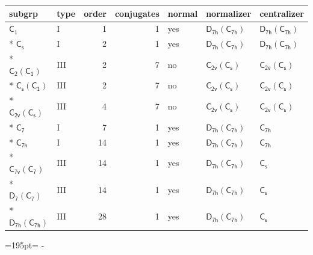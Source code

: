 \documentclass[10pt,a4paper]{article}
\newcommand{\needspace}[1]{\par\penalty-100\begingroup\dimen0=#1\relax\dimen2=\pagegoal
  \advance\dimen2-\pagetotal\ifdim\dimen0>\dimen2\relax\ifdim\dimen2>0pt\vfil\break\fi\fi
  \endgroup}
\numberwithin{equation}{section}
\newcommand{\grp}[1]{\mathsf{#1}}
\begin{document}
{\small\begin{longtable}{@{}llrrlll@{}}\toprule
subgrp & type & order & conjugates & normal & normalizer & centralizer\\\midrule\endhead
\bottomrule\endfoot\endlastfoot
\href{../../../rotation/data/pdf/C1.pdf}{$\grp{C_{1}}$} & I & 1 & 1 & yes & \href{D7h-C7h.pdf}{$\grp{D_{7h}}(\grp{C_{7h}})$} & \href{D7h-C7h.pdf}{$\grp{D_{7h}}(\grp{C_{7h}})$}\\*
\href{../../../rotation/data/pdf/C1v.pdf}{$\grp{C_{s}}$} & I & 2 & 1 & yes & \href{D7h-C7h.pdf}{$\grp{D_{7h}}(\grp{C_{7h}})$} & \href{D7h-C7h.pdf}{$\grp{D_{7h}}(\grp{C_{7h}})$}\\*
\href{C2-C1.pdf}{$\grp{C_{2}}(\grp{C_{1}})$} & III & 2 & 7 & no & \href{C2v-C1v.pdf}{$\grp{C_{2v}}(\grp{C_{s}})$} & \href{C2v-C1v.pdf}{$\grp{C_{2v}}(\grp{C_{s}})$}\\*
\href{C1v-C1.pdf}{$\grp{C_{s}}(\grp{C_{1}})$} & III & 2 & 7 & no & \href{C2v-C1v.pdf}{$\grp{C_{2v}}(\grp{C_{s}})$} & \href{C2v-C1v.pdf}{$\grp{C_{2v}}(\grp{C_{s}})$}\\*
\href{C2v-C1v.pdf}{$\grp{C_{2v}}(\grp{C_{s}})$} & III & 4 & 7 & no & \href{C2v-C1v.pdf}{$\grp{C_{2v}}(\grp{C_{s}})$} & \href{C2v-C1v.pdf}{$\grp{C_{2v}}(\grp{C_{s}})$}\\*
\href{../../../rotation/data/pdf/C7.pdf}{$\grp{C_{7}}$} & I & 7 & 1 & yes & \href{D7h-C7h.pdf}{$\grp{D_{7h}}(\grp{C_{7h}})$} & \href{../../../rotation/data/pdf/C7h.pdf}{$\grp{C_{7h}}$}\\*
\href{../../../rotation/data/pdf/C7h.pdf}{$\grp{C_{7h}}$} & I & 14 & 1 & yes & \href{D7h-C7h.pdf}{$\grp{D_{7h}}(\grp{C_{7h}})$} & \href{../../../rotation/data/pdf/C7h.pdf}{$\grp{C_{7h}}$}\\*
\href{C7v-C7.pdf}{$\grp{C_{7v}}(\grp{C_{7}})$} & III & 14 & 1 & yes & \href{D7h-C7h.pdf}{$\grp{D_{7h}}(\grp{C_{7h}})$} & \href{../../../rotation/data/pdf/C1v.pdf}{$\grp{C_{s}}$}\\*
\href{D7-C7.pdf}{$\grp{D_{7}}(\grp{C_{7}})$} & III & 14 & 1 & yes & \href{D7h-C7h.pdf}{$\grp{D_{7h}}(\grp{C_{7h}})$} & \href{../../../rotation/data/pdf/C1v.pdf}{$\grp{C_{s}}$}\\*
\href{D7h-C7h.pdf}{$\grp{D_{7h}}(\grp{C_{7h}})$} & III & 28 & 1 & yes & \href{D7h-C7h.pdf}{$\grp{D_{7h}}(\grp{C_{7h}})$} & \href{../../../rotation/data/pdf/C1v.pdf}{$\grp{C_{s}}$}\\
\bottomrule\end{longtable}}
\needspace{195pt}
\end{document}
